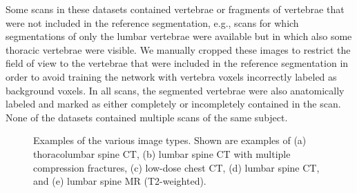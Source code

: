 \documentclass[authoryear,5p,final,times]{elsarticle}
\begin{document}
    Some scans in these datasets contained vertebrae or fragments of vertebrae that were not included in the reference segmentation, e.g., scans for which segmentations of only the lumbar vertebrae were available but in which also some thoracic vertebrae were visible. We manually cropped these images to restrict the field of view to the vertebrae that were included in the reference segmentation in order to avoid training the network with vertebra voxels incorrectly labeled as background voxels. In all scans, the segmented vertebrae were also anatomically labeled and marked as either completely or incompletely contained in the scan. None of the datasets contained multiple scans of the same subject.
    
    \begin{figure}[t]
        \centering
        \caption{Examples of the various image types. Shown are examples of (a) thoracolumbar spine CT, (b) lumbar spine CT with multiple compression fractures, (c) low-dose chest CT, (d) lumbar spine CT, and (e) lumbar spine MR (T2-weighted).}
        \label{fig:examples_plain_images}
    \end{figure}
    
\end{document}
